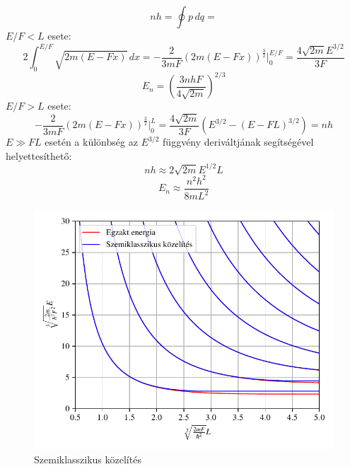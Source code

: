 \begin{equation}
		nh = \oint p \, dq = 
	\end{equation}
	$E/F < L$ esete:
	\begin{equation}
		2\int_0^{E/F}\sqrt{2m\left( E-Fx \right)}\,dx = -\frac{2}{3mF}\left(2m\left( E-Fx \right)\right)^{\frac{3}{2}}\bigg \rvert_0^{E/F} = \frac{4\sqrt{2m}E^{3/2}}{3F}
	\end{equation}
	\begin{equation}
		E_n = \left(\frac{3nhF}{4\sqrt{2m}}\right)^{2/3}
	\end{equation}
	$E/F > L$ esete:
	\begin{equation}
		-\frac{2}{3mF}\left(2m\left( E-Fx \right)\right)^{\frac{3}{2}}\bigg \rvert_0^{L} = \frac{4\sqrt{2m}}{3F}\left(E^{3/2} - \left(E - FL\right)^{3/2}\right) = nh
	\end{equation}
	$E \gg FL$ esetén a különbség az $E^{3/2}$ függvény deriváltjának segítségével helyettesíthető:
	\begin{equation}
		nh \approx 2\sqrt{2m}E^{1/2}L
	\end{equation}
	\begin{equation}
		E_n \approx \frac{n^2h^2}{8mL^2}
	\end{equation}
	
	\begin{figure}[H]
		\includegraphics[scale=1]{./figs/energiaszintkozelites.pdf}
		\caption{Szemiklasszikus közelítés}
	\end{figure}
	
